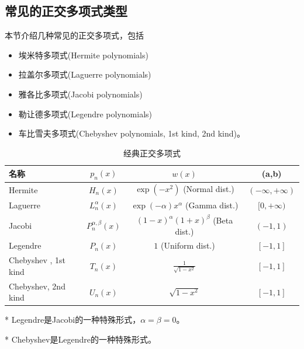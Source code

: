 \begin{subappendices}
\section{常见的正交多项式类型}
\label{eq:poly-orthogonality-types}
本节介绍几种常见的正交多项式，包括
\begin{itemize}
  \item 埃米特多项式(Hermite polynomials)
  \item 拉盖尔多项式(Laguerre polynomials)
  \item 雅各比多项式(Jacobi polynomials)
  \item 勒让德多项式(Legendre polynomials)
  \item 车比雪夫多项式(Chebyshev polynomials, 1st kind, 2nd kind)。
\end{itemize}

\begin{table}[htbp]
\begin{center}
    \scriptsize
    \def\arraystretch{1.2}
    \centering
    \caption{经典正交多项式}
    \begin{threeparttable}
    \begin{tabular}{lccc}
        \hline
        名称 & $p_n(x)$ & $w(x)$ & (a,b) \\
        \hline
        Hermite & $H_n(x)$ & $\exp(-x^2)$ (Normal dist.) & $(-\infty, + \infty)$ \\
        Laguerre & $L_n^{\alpha}(x)$ & $\exp(-\alpha) x^{\alpha}$ (Gamma dist.)& $ [0, +\infty)$ \\
        Jacobi & $P_n^{\alpha,\beta}(x)$ & $(1-x)^{\alpha} (1+x)^{\beta}$ (Beta dist.) & $(-1,1)$ \\
        Legendre\tnote{*} & $P_n(x)$ & $1$ (Uniform dist.)& $[-1,1]$ \\
        Chebyshev\tnote{**} , 1st kind & $T_n(x)$ & $\frac{1}{\sqrt{1-x^2}}$ & $\left[ -1,1 \right]$ \\
        Chebyshev, 2nd kind & $U_n(x)$ & $\sqrt{1-x^2}$ & $\left[ -1,1 \right]$ \\
        \hline
    \end{tabular}
    \begin{tablenotes}
        \footnotesize
        \item[*] Legendre是Jacobi的一种特殊形式，$\alpha = \beta = 0$。
        \item[*] Chebyshev是Legendre的一种特殊形式。
    \end{tablenotes}
\end{threeparttable}
\end{center}
  \label{tab:poly-ortho-poly-classical}
\end{table}



\end{subappendices}
